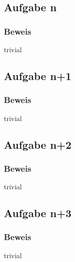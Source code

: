 \documentclass[12pt]{scrartcl}
\date{\today}
\begin{document}
\subsection*{Aufgabe n}

\subsubsection*{Beweis}
\einruecken

trivial

\ausruecken

\subsection*{Aufgabe n+1}

\subsubsection*{Beweis}
\einruecken

trivial

\ausruecken

\subsection*{Aufgabe n+2}

\subsubsection*{Beweis}
\einruecken

trivial

\ausruecken

\subsection*{Aufgabe n+3}

\subsubsection*{Beweis}
\einruecken

trivial

\ausruecken
	
\end{document}
